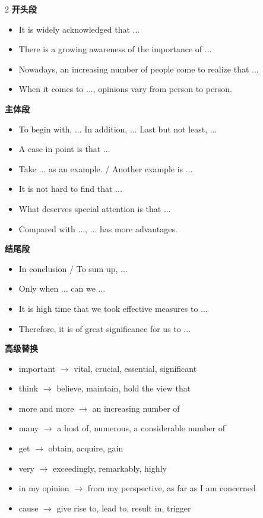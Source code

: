 \begin{multicols}{2}
\textbf{开头段}
\begin{itemize}
  \item It is widely acknowledged that ...
  \item There is a growing awareness of the importance of ...
  \item Nowadays, an increasing number of people come to realize that ...
  \item When it comes to ..., opinions vary from person to person.
\end{itemize}

\textbf{主体段}
\begin{itemize}
  \item To begin with, ... In addition, ... Last but not least, ...
  \item A case in point is that ...
  \item Take ... as an example. / Another example is ...
  \item It is not hard to find that ...
  \item What deserves special attention is that ...
  \item Compared with ..., ... has more advantages.
\end{itemize}

\textbf{结尾段}
\begin{itemize}
  \item In conclusion / To sum up, ...
  \item Only when ... can we ...
  \item It is high time that we took effective measures to ...
  \item Therefore, it is of great significance for us to ...
\end{itemize}

\textbf{高级替换}
\begin{itemize}
  \item important $\to$ vital, crucial, essential, significant
  \item think $\to$ believe, maintain, hold the view that
  \item more and more $\to$ an increasing number of
  \item many $\to$ a host of, numerous, a considerable number of
  \item get $\to$ obtain, acquire, gain
  \item very $\to$ exceedingly, remarkably, highly
  \item in my opinion $\to$ from my perspective, as far as I am concerned
  \item cause $\to$ give rise to, lead to, result in, trigger
\end{itemize}
\end{multicols}

